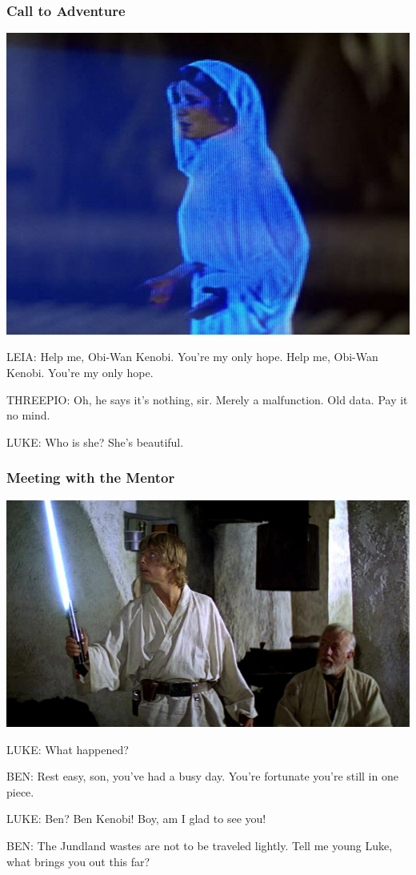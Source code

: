 \documentclass{beamer}
\begin{document}
\begin{frame}\frametitle{Call to Adventure}

\includegraphics[scale=.4]{help-me-obi-wan.jpg}

LEIA: Help me, Obi-Wan Kenobi. You're my only hope. Help me, Obi-Wan
Kenobi. You're my only hope.
\bigskip

THREEPIO: Oh, he says it's nothing, sir. Merely a malfunction. Old
data. Pay it no mind.
\bigskip


LUKE: Who is she? She's beautiful.



\end{frame}
\begin{frame}\frametitle{Meeting with the Mentor}

\includegraphics[scale=0.3]{lukementor.png}

LUKE: What happened?



BEN: Rest easy, son, you've had a busy day. You're fortunate you're
still in one piece.



LUKE: Ben? Ben Kenobi! Boy, am I glad to see you! 



BEN: The Jundland wastes are not to be traveled lightly. Tell me young
Luke, what brings you out this far?


\end{frame}
\end{document}

